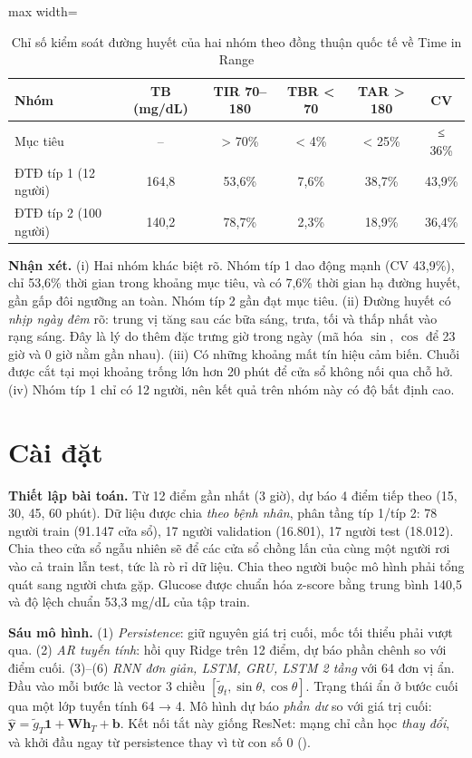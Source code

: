 \begin{table}[H]
\centering
\caption{Chỉ số kiểm soát đường huyết của hai nhóm theo đồng thuận quốc tế về Time in Range \cite{battelino2019}}
\label{tab:cgm-stats}
\small
\begin{adjustbox}{max width=\linewidth}
\begin{tabular}{@{}lccccc@{}}
\toprule
\textbf{Nhóm} & \textbf{TB (mg/dL)} & \textbf{TIR 70–180} & \textbf{TBR < 70} & \textbf{TAR > 180} & \textbf{CV} \\
\midrule
Mục tiêu & -- & > 70\% & < 4\% & < 25\% & ≤ 36\% \\
ĐTĐ típ 1 (12 người) & 164,8 & 53,6\% & 7,6\% & 38,7\% & 43,9\% \\
ĐTĐ típ 2 (100 người) & 140,2 & 78,7\% & 2,3\% & 18,9\% & 36,4\% \\
\bottomrule
\end{tabular}
\end{adjustbox}
\end{table}

\textbf{Nhận xét.} (i) Hai nhóm khác biệt rõ. Nhóm típ 1 dao động mạnh (CV 43,9\%), chỉ 53,6\% thời gian trong khoảng mục tiêu, và có 7,6\% thời gian hạ đường huyết, gần gấp đôi ngưỡng an toàn. Nhóm típ 2 gần đạt mục tiêu. (ii) Đường huyết có \emph{nhịp ngày đêm} rõ: trung vị tăng sau các bữa sáng, trưa, tối và thấp nhất vào rạng sáng. Đây là lý do thêm đặc trưng giờ trong ngày (mã hóa $\sin$, $\cos$ để 23 giờ và 0 giờ nằm gần nhau). (iii) Có những khoảng mất tín hiệu cảm biến. Chuỗi được cắt tại mọi khoảng trống lớn hơn 20 phút để cửa sổ không nối qua chỗ hở. (iv) Nhóm típ 1 chỉ có 12 người, nên kết quả trên nhóm này có độ bất định cao.

\section{Cài đặt}

\textbf{Thiết lập bài toán.} Từ 12 điểm gần nhất (3 giờ), dự báo 4 điểm tiếp theo (15, 30, 45, 60 phút). Dữ liệu được chia \emph{theo bệnh nhân}, phân tầng típ 1/típ 2: 78 người train (91.147 cửa sổ), 17 người validation (16.801), 17 người test (18.012). Chia theo cửa sổ ngẫu nhiên sẽ để các cửa sổ chồng lấn của cùng một người rơi vào cả train lẫn test, tức là rò rỉ dữ liệu. Chia theo người buộc mô hình phải tổng quát sang người chưa gặp. Glucose được chuẩn hóa z-score bằng trung bình 140,5 và độ lệch chuẩn 53,3 mg/dL của tập train.

\textbf{Sáu mô hình.} (1) \emph{Persistence}: giữ nguyên giá trị cuối, mốc tối thiểu phải vượt qua. (2) \emph{AR tuyến tính}: hồi quy Ridge trên 12 điểm, dự báo phần chênh so với điểm cuối. (3)–(6) \emph{RNN đơn giản, LSTM, GRU, LSTM 2 tầng} với 64 đơn vị ẩn. Đầu vào mỗi bước là vector 3 chiều $[\tilde g_t, \sin\theta, \cos\theta]$. Trạng thái ẩn ở bước cuối qua một lớp tuyến tính 64 → 4. Mô hình dự báo \emph{phần dư} so với giá trị cuối: $\hat{\mathbf y} = \tilde g_T\mathbf 1 + \mathbf W\mathbf h_T + \mathbf b$. Kết nối tắt này giống ResNet: mạng chỉ cần học \emph{thay đổi}, và khởi đầu ngay từ persistence thay vì từ con số 0 ().

